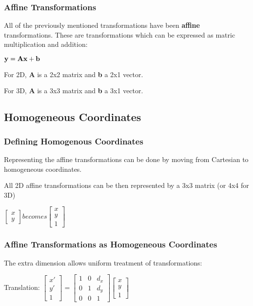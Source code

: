 \documentclass{article}\author{Hawley, Adam}
\begin{document}
\subsubsection{Affine Transformations}
All of the previously mentioned transformations have been {\bf affine} transformations. These are transformations which can be expressed as matric multiplication and addition: 

\centerline{$ \bf y = Ax + b $} 

For 2D, {\bf A} is a 2x2 matrix and {\bf b} a 2x1 vector.

For 3D, {\bf A} is a 3x3 matrix and {\bf b} a 3x1 vector.  

\subsection{Homogeneous Coordinates}
\subsubsection{Defining Homogenous Coordinates}
Representing the affine transformations can be done by moving from Cartesian to homogeneous coordinates.

All 2D affine transformations can be then represented by a 3x3 matrix (or 4x4 for 3D)

\centerline{$
	\begin{bmatrix}
		x \\ y
	\end{bmatrix}
	becomes
	\begin{bmatrix}
		x \\ y \\ 1
	\end{bmatrix}
$}

\subsubsection{Affine Transformations as Homogeneous Coordinates}
The extra dimension allows uniform treatment of transformations:

Translation: $\begin{bmatrix}x' \\ y' \\ 1 \end{bmatrix}
= \begin{bmatrix}1&0&d_x\\0&1&d_y\\0&0&1\end{bmatrix}
\begin{bmatrix} x\\y\\1\end{bmatrix}$ 
\end{document}
